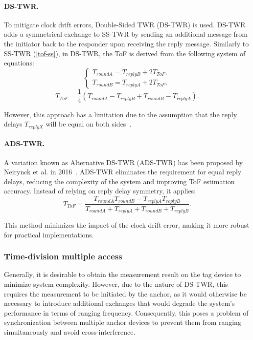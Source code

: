 \paragraph{DS-TWR.} 
To mitigate clock drift errors, Double-Sided TWR (DS-TWR) is used. DS-TWR adds a symmetrical exchange to SS-TWR by sending an additional message from the initiator back to the responder upon receiving the reply message. Similarly to SS-TWR (\autoref{tof-ss}), in DS-TWR, the ToF is derived from the following system of equations: 
\begin{equation}
\begin{cases}
T_{roundA} = T_{replyB} + 2T_{ToF},\\
T_{roundB} = T_{replyA} + 2T_{ToF},
\end{cases}
\end{equation}
\begin{equation}
T_{ToF} = \frac{1}{4} (T_{roundA} - T_{replyB} + T_{roundB} - T_{replyA}).
\end{equation}

However, this approach has a limitation due to the assumption that the reply delays $T_{replyX}$ will be equal on both sides~\cite{neirynck2016alternative}. 

\paragraph{ADS-TWR.}\label{adstwr}
A variation known as Alternative DS-TWR (ADS-TWR) has been proposed by Neirynck et al. in 2016~\cite{neirynck2016alternative}. ADS-TWR eliminates the requirement for equal reply delays, reducing the complexity of the system and improving ToF estimation accuracy. Instead of relying on reply delay symmetry, it applies:
\begin{equation}
T_{ToF} = \frac{T_{roundA}T_{roundB} - T_{replyA}T_{replyB}}{T_{roundA} + T_{replyA} + T_{roundB} + T_{replyB}}.
\end{equation}

This method minimizes the impact of the clock drift error, making it more robust for practical implementations.

\subsubsection{Time-division multiple access}\label{tdma}

Generally, it is desirable to obtain the measurement result on the tag device to minimize system complexity. However, due to the nature of DS-TWR, this requires the measurement to be initiated by the anchor, as it would otherwise be necessary to introduce additional exchanges that would degrade the system's performance in terms of ranging frequency. Consequently, this poses a problem of synchronization between multiple anchor devices to prevent them from ranging simultaneously and avoid cross-interference. 

